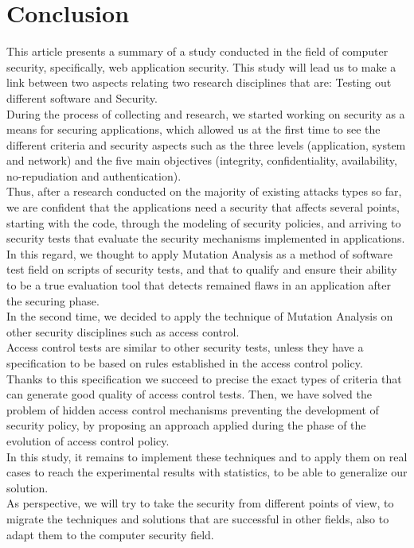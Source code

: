 \documentclass{acm_proc_article-sp}
\begin{document}
\section{Conclusion}

This article presents a summary of a study conducted in the field of computer security, specifically, web application security. This study will lead us to make a link between two aspects relating two research disciplines that are: Testing out different software and Security.\\
During the process of collecting and research, we started working on security as a means for securing applications, which allowed us at the first time to see the different criteria and security aspects such as the three levels (application, system and network) and the five main objectives (integrity, confidentiality, availability, no-repudiation and authentication). \\
Thus, after a research conducted on the majority of existing attacks types so far, we are confident that the applications need a security that affects several points, starting with the code, through the modeling of security policies, and arriving to security tests that evaluate the security mechanisms implemented in applications.\\
In this regard, we thought to apply Mutation Analysis as a method of software test field on  scripts of security tests, and that to qualify and ensure their ability to be a true evaluation tool that detects remained flaws in an application after the securing phase.\\
In the second time, we decided to apply the technique of Mutation Analysis on other security disciplines such as access control.\\
Access control tests are similar to other security tests, unless they have a specification to be based on rules established in the access control policy.\\
Thanks to this specification we succeed to precise the exact types of criteria that can generate good quality of access control tests. Then, we have solved the problem of hidden access control mechanisms preventing the development of security policy, by proposing an approach applied during the phase of the evolution of access control policy.\\
In this study, it remains to implement these techniques and to apply them on real cases to reach the experimental results with statistics, to be able to generalize our solution.\\
As perspective, we will try to take the security from different points of view, to migrate the techniques and solutions that are successful in other fields, also to adapt them to the computer security field.


  
\end{document}
